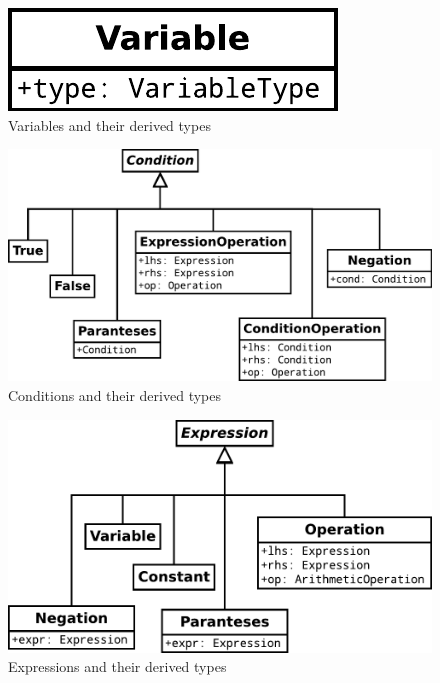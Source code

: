 \begin{figure}[h]
	\centering
	\includegraphics[scale=.5]{../fig/Variable}
	\caption{Variables and their derived types}
	\label{fig:variable}
\end{figure}

\begin{figure}[h]
	\centering
	\includegraphics[scale=.5]{../fig/Condition}
	\caption{Conditions and their derived types}
	\label{fig:condition}
\end{figure}

\begin{figure}[h]
	\centering
	\includegraphics[scale=.5]{../fig/Expression}
	\caption{Expressions and their derived types}
	\label{fig:expression}
\end{figure}

